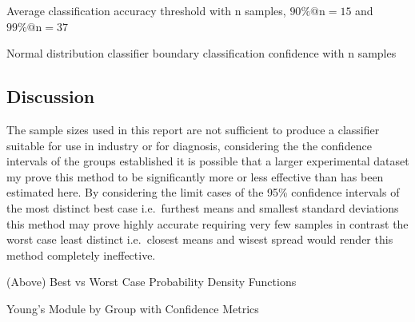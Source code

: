 \documentclass[
  paper=a4,
  ,captions=tableheading
]{scrartcl}
\makeatletter
\newcommand*\pandocbounded[1]{%
  \sbox\pandoc@box{#1}%
  \Gscale@div\@tempa{\textheight}{\dimexpr\ht\pandoc@box+\dp\pandoc@box\relax}%
  \Gscale@div\@tempb{\linewidth}{\wd\pandoc@box}%
  \ifdim\@tempb\p@<\@tempa\p@\let\@tempa\@tempb\fi%
  \ifdim\@tempa\p@<\p@\scalebox{\@tempa}{\usebox\pandoc@box}%
  \else\usebox{\pandoc@box}%
  \fi%
}
\renewenvironment{quote}{\begin{customblockquote}\list{}{\rightmargin=0em\leftmargin=0em}%
\item\relax\color{blockquote-text}\ignorespaces}{\unskip\unskip\endlist\end{customblockquote}}
\makeatother
\begin{document}
\noindent
\begin{minipage}[t]{0.48\textwidth}
\begin{quote}
\pandocbounded{}
Average classification accuracy threshold with n samples,
\(90 \% @ \text{n}=15\) and \(99 \% @ \text{n}=37\)
\end{quote}
\end{minipage}
\hfill
\begin{minipage}[t]{0.48\textwidth}
\begin{quote}
\pandocbounded{}
Normal distribution classifier boundary classification confidence with n
samples
\end{quote}
\end{minipage}

\subsection{Discussion}\label{discussion}

The sample sizes used in this report are not sufficient to produce a
classifier suitable for use in industry or for diagnosis, considering
the the confidence intervals of the groups established it is possible
that a larger experimental dataset my prove this method to be
significantly more or less effective than has been estimated here. By
considering the limit cases of the 95\% confidence intervals of the most
distinct best case i.e.~furthest means and smallest standard deviations
this method may prove highly accurate requiring very few samples in
contrast the worst case least distinct i.e.~closest means and wisest
spread would render this method completely ineffective.

\noindent
\begin{minipage}[t]{0.48\textwidth}
\begin{quote}
\pandocbounded{}
(Above) Best vs Worst Case Probability Density Functions
\end{quote}
\end{minipage}
\hfill
\begin{minipage}[t]{0.48\textwidth}
Young's Module by Group with Confidence Metrics

\pandocbounded{}

\begin{figure}
\centering
\caption{}
\end{figure}

\begin{quote}
\end{quote}
\end{minipage}
\end{document}
